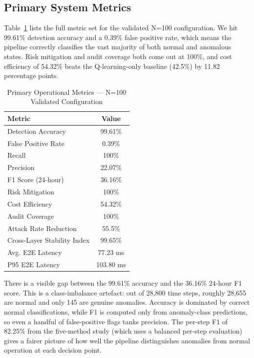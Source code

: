 \documentclass[conference]{IEEEtran}
\begin{document}
\subsection{Primary System Metrics}

Table~\ref{tab:primary} lists the full metric set for the validated N=100 configuration. We hit 99.61\% detection accuracy and a 0.39\% false positive rate, which means the pipeline correctly classifies the vast majority of both normal and anomalous states. Risk mitigation and audit coverage both come out at 100\%, and cost efficiency of 54.32\% beats the Q-learning-only baseline (42.5\%) by 11.82 percentage points.

\begin{table}[htbp]
\caption{Primary Operational Metrics --- N=100 Validated Configuration}
\begin{center}
\begin{tabular}{|l|c|}
\hline
\textbf{Metric} & \textbf{Value} \\
\hline
Detection Accuracy & 99.61\% \\
\hline
False Positive Rate & 0.39\% \\
\hline
Recall & 100\% \\
\hline
Precision & 22.07\% \\
\hline
F1 Score (24-hour) & 36.16\% \\
\hline
Risk Mitigation & 100\% \\
\hline
Cost Efficiency & 54.32\% \\
\hline
Audit Coverage & 100\% \\
\hline
Attack Rate Reduction & 55.5\% \\
\hline
Cross-Layer Stability Index & 99.65\% \\
\hline
Avg. E2E Latency & 77.23 ms \\
\hline
P95 E2E Latency & 103.80 ms \\
\hline
\end{tabular}
\label{tab:primary}
\end{center}
\end{table}

There is a visible gap between the 99.61\% accuracy and the 36.16\% 24-hour F1 score. This is a class-imbalance artefact: out of 28{,}800 time steps, roughly 28{,}655 are normal and only 145 are genuine anomalies. Accuracy is dominated by correct normal classifications, while F1 is computed only from anomaly-class predictions, so even a handful of false-positive flags tanks precision. The per-step F1 of 82.25\% from the five-method study (which uses a balanced per-step evaluation) gives a fairer picture of how well the pipeline distinguishes anomalies from normal operation at each decision point.
\end{document}
